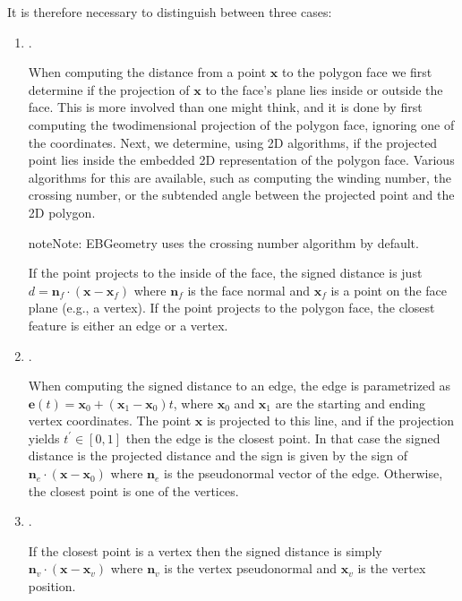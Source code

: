 \documentclass[letterpaper,10pt,english]{sphinxmanual}
\begin{document}
\sphinxAtStartPar
It is therefore necessary to distinguish between three cases:
\begin{enumerate}
%
\item {} 
\sphinxAtStartPar
{}.

\sphinxAtStartPar
When computing the distance from a point \(\mathbf{x}\) to the polygon face we first determine if the projection of \(\mathbf{x}\) to the face’s plane lies inside or outside the face.
This is more involved than one might think, and it is done by first computing the two\sphinxhyphen{}dimensional projection of the polygon face, ignoring one of the coordinates.
Next, we determine, using 2D algorithms, if the projected point lies inside the embedded 2D representation of the polygon face.
Various algorithms for this are available, such as computing the winding number, the crossing number, or the subtended angle between the projected point and the 2D polygon.

\begin{sphinxadmonition}{note}{Note:}
\sphinxAtStartPar
EBGeometry uses the crossing number algorithm by default.
\end{sphinxadmonition}

\sphinxAtStartPar
If the point projects to the inside of the face, the signed distance is just \(d = \mathbf{n}_f\cdot\left(\mathbf{x} - \mathbf{x}_f\right)\) where \(\mathbf{n}_f\) is the face normal and \(\mathbf{x}_f\) is a point on the face plane (e.g., a vertex).
If the point projects to  the polygon face, the closest feature is either an edge or a vertex.

\item {} 
\sphinxAtStartPar
{}.

\sphinxAtStartPar
When computing the signed distance to an edge, the edge is parametrized as \(\mathbf{e}(t) = \mathbf{x}_0 + \left(\mathbf{x}_1 - \mathbf{x}_0\right)t\), where \(\mathbf{x}_0\) and \(\mathbf{x}_1\) are the starting and ending vertex coordinates.
The point \(\mathbf{x}\) is projected to this line, and if the projection yields \(t^\prime \in [0,1]\) then the edge is the closest point.
In that case the signed distance is the projected distance and the sign is given by the sign of \(\mathbf{n}_e\cdot\left(\mathbf{x} - \mathbf{x}_0\right)\) where \(\mathbf{n}_e\) is the pseudonormal vector of the edge.
Otherwise, the closest point is one of the vertices.

\item {} 
\sphinxAtStartPar
{}.

\sphinxAtStartPar
If the closest point is a vertex then the signed distance is simply \(\mathbf{n}_v\cdot\left(\mathbf{x}-\mathbf{x}_v\right)\) where \(\mathbf{n}_v\) is the vertex pseudonormal and \(\mathbf{x}_v\) is the vertex position.

\end{enumerate}
\end{document}
